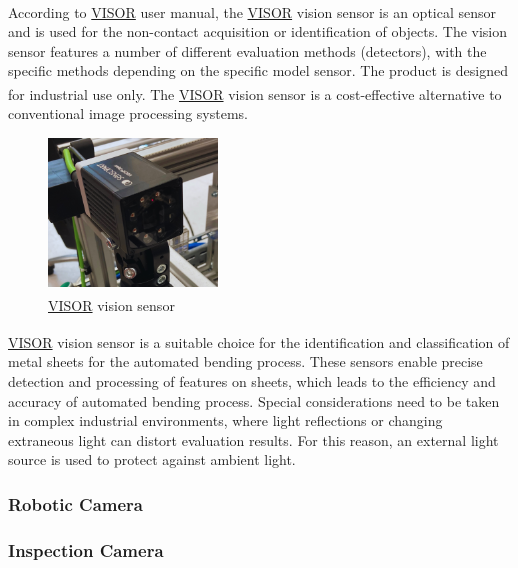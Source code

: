 According to \hyperref[acro:VISOR]{VISOR}\textsuperscript{\textregistered} \cite[page 22]{visor_user_manual} user manual, the \hyperref[acro:VISOR]{VISOR}\textsuperscript{\textregistered} vision sensor is an optical sensor and is used for the non-contact acquisition or identification of objects.
The vision sensor features a number of different evaluation methods (detectors), with the specific methods
depending on the specific model sensor. The product is designed for industrial use only. The \hyperref[acro:VISOR]{VISOR}\textsuperscript{\textregistered} vision sensor is a cost-effective alternative to conventional image processing systems.


\begin{figure}[h]
    \centering
    \includegraphics[width=0.4\textwidth]{figures/vision-sensor.png}
    \caption{\hyperref[acro:VISOR]{VISOR}\textsuperscript{\textregistered} vision sensor}
    \label{fig:vision-sensor}
\end{figure}

\hyperref[acro:VISOR]{VISOR}\textsuperscript{\textregistered} vision sensor is a suitable choice for the identification and classification of metal sheets for the automated bending process.
These sensors enable precise detection and processing of features on sheets, which leads to the efficiency and accuracy of automated bending process.
Special considerations need to be taken in complex industrial environments, where light reflections or changing extraneous light can distort evaluation results. For this reason, an external light source is used to protect against ambient light.

\subsubsection{Robotic Camera}
\label{subsubsec:robotic-camera}

\subsubsection{Inspection Camera}
\label{subsubsec:inspection-camera}